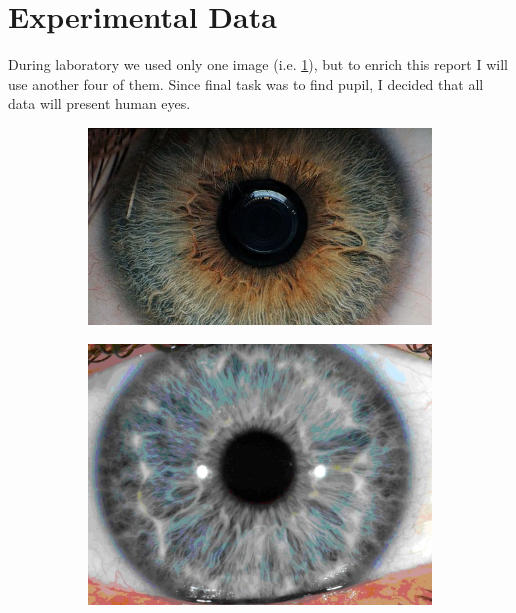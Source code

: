 \documentclass{article}
\begin{document}
\section{Experimental Data}
During laboratory we used only one image (i.e. \ref{fig:sample_1}), but to enrich this report I will use another four of them. Since final task was to find pupil, I decided that all data will present human eyes.

\begin{figure}[H]
\centering
\begin{subfigure}{.5\textwidth}
  \centering
  \includegraphics[width=0.97\linewidth]{_Figures/raw_data_1.jpg}
  \caption{}
  \label{fig:sample_1}
\end{subfigure}%
\begin{subfigure}{.5\textwidth}
  \centering
  \includegraphics[width=0.97\linewidth]{_Figures/raw_data_2.jpg}
    \caption{}
  \label{fig:sample_2}
\end{subfigure}

\end{figure}
\end{document}
